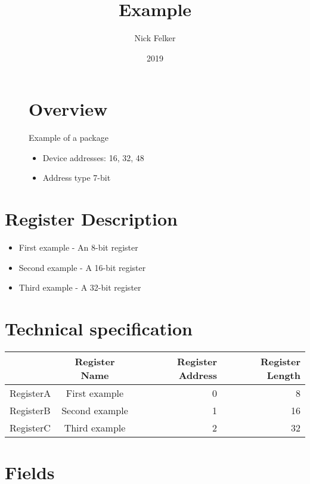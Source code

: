 \documentclass[a4paper,12pt,oneside,pdflatex,italian,final,twocolumn]{article}
\title{ Example }
\author{ Nick Felker }
\date{ 2019 }
\begin{document}
\pagestyle{fancy}



\onecolumn


\begin{figure}
\begin{minipage}{0.47\textwidth}

\section{Overview}
    Example of a package
    \begin{itemize}
        \item Device addresses:
          16,
          32,
          48
        \item Address type 7-bit
    \end{itemize}


\end{minipage}
\hfill

\end{figure}


\section{Register Description}
\begin{itemize}
\item First example - An 8-bit register
\item Second example - A 16-bit register
\item Third example - A 32-bit register
\end{itemize}

\section{Technical specification}
\centering
\begin{tabular}{lcrr}
\toprule
 & Register Name & Register Address & Register Length \\
\midrule
RegisterA & First example & 0 & 8 \\
RegisterB & Second example & 1 & 16 \\
RegisterC & Third example & 2 & 32 \\
\bottomrule
\end{tabular}

\raggedright

\section{Fields}
\end{document}
